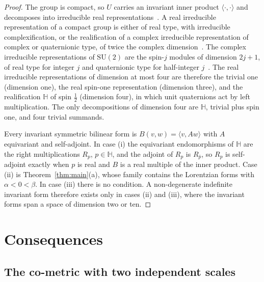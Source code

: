 \documentclass[12pt,a4paper]{article}
\newcommand{\SU}{\mathrm{SU}}
\begin{document}
      \begin{proof}
        The group is compact, so $U$ carries an invariant inner product $\langle\cdot,\cdot\rangle$ and decomposes into
        irreducible real representations~\cite{BrockerTomDieck1985}.
        A real irreducible representation of a compact group is either of real type, with irreducible
        complexification, or the realification of a complex irreducible representation of complex or quaternionic
        type, of twice the complex dimension~\cite{BrockerTomDieck1985}.
        The complex irreducible representations of $\SU(2)$ are the spin-$j$ modules of dimension $2j+1$, of real
        type for integer $j$ and quaternionic type for half-integer $j$~\cite{FultonHarris1991}.
        The real irreducible representations of dimension at most four are therefore the trivial one (dimension one),
        the real spin-one representation (dimension three), and the realification $\mathbb{H}$ of spin $\tfrac12$
        (dimension four), in which unit quaternions act by left multiplication.
        The only decompositions of dimension four are $\mathbb{H}$, trivial plus spin one, and four trivial summands.

        Every invariant symmetric bilinear form is $B(v,w) = \langle v, Aw\rangle$ with $A$ equivariant and
        self-adjoint.
        In case (i) the equivariant endomorphisms of $\mathbb{H}$ are the right multiplications $R_p$,
        $p\in\mathbb{H}$, and the adjoint of $R_p$ is $R_{\bar p}$, so $R_p$ is self-adjoint exactly when $p$ is real
        and $B$ is a real multiple of the inner product.
        Case (ii) is Theorem~\ref{thm:main}(a), whose family contains the Lorentzian forms with $\alpha<0<\beta$.
        In case (iii) there is no condition.
        A non-degenerate indefinite invariant form therefore exists only in cases (ii) and (iii), where the invariant
        forms span a space of dimension two or ten.
      \end{proof}

  \section{Consequences}
    \label{sec:consequences}

    \subsection{The co-metric with two independent scales}
\end{document}
